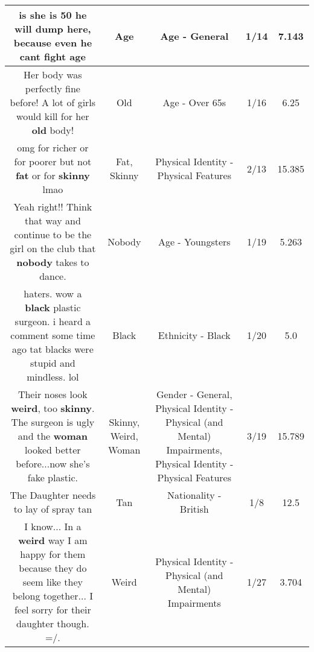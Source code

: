 \documentclass[11pt]{article}
\newlength\mylength
\begin{document}
\begin{center}
\begin{longtable}{|C{.65\mylength}|C{.30\mylength}|C{.12\mylength}|C{.12\mylength}|C{.12\mylength}|}
  \small is she is 50 he will dump here, because even he cant fight age\normalsize   & Age & Age - General & 1/14 & 7.143 \\  \hline
  \small Her body was perfectly fine before! A lot of girls would kill for her \textbf{old} body!\normalsize   & Old & Age - Over 65s & 1/16 & 6.25 \\  \hline
  \small omg for richer or for poorer but not \textbf{fat} or for \textbf{skinny} lmao\normalsize   & Fat, Skinny & Physical Identity - Physical Features & 2/13 & 15.385 \\  \hline
  \small Yeah right!!  Think that way and continue to be the girl on the club that \textbf{nobody} takes to dance.\normalsize   & Nobody & Age - Youngsters & 1/19 & 5.263 \\  \hline
  \small haters. wow a \textbf{black} plastic surgeon. i heard a comment some time ago tat blacks were stupid and mindless. lol\normalsize   & Black & Ethnicity - Black & 1/20 & 5.0 \\  \hline
  \small Their noses look \textbf{weird}, too \textbf{skinny}. The surgeon is ugly and the \textbf{woman} looked better before...now she's fake plastic.\normalsize   & Skinny, Weird, Woman & Gender - General, Physical Identity - Physical (and Mental) Impairments, Physical Identity - Physical Features & 3/19 & 15.789 \\  \hline
  \small The Daughter needs to lay of spray tan\normalsize   & Tan & Nationality - British & 1/8 & 12.5 \\  \hline
  \small I know... In a \textbf{weird} way I am happy for them because they do seem like they belong together... I feel sorry for their daughter though. =/.\normalsize   & Weird & Physical Identity - Physical (and Mental) Impairments & 1/27 & 3.704 \\  \hline

\end{longtable}
\end{center}
\end{document}
